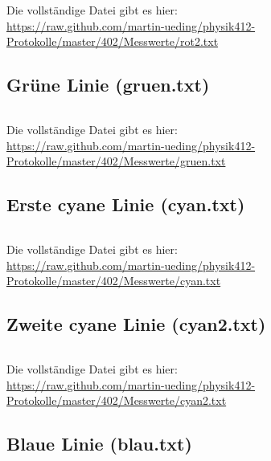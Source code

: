 \begin{appendix}
    Die vollständige Datei gibt es hier: \\
    \url{https://raw.github.com/martin-ueding/physik412-Protokolle/master/402/Messwerte/rot2.txt}

    \subsection{Grüne Linie (gruen.txt)}
    \begin{multicols}{5}
        \inputminted[tabsize=4, firstline=<< gruen_lower >>, lastline=<< gruen_upper >>, fontsize=\footnotesize]{text}{../Messwerte/gruen.txt}
    \end{multicols}

    Die vollständige Datei gibt es hier: \\
    \url{https://raw.github.com/martin-ueding/physik412-Protokolle/master/402/Messwerte/gruen.txt}

    \subsection{Erste cyane Linie (cyan.txt)}
    \begin{multicols}{5}
        \inputminted[tabsize=4, firstline=<< cyan_lower >>, lastline=<< cyan_upper >>, fontsize=\footnotesize]{text}{../Messwerte/cyan.txt}
    \end{multicols}

    Die vollständige Datei gibt es hier: \\
    \url{https://raw.github.com/martin-ueding/physik412-Protokolle/master/402/Messwerte/cyan.txt}

    \subsection{Zweite cyane Linie (cyan2.txt)}
    \begin{multicols}{5}
        \inputminted[tabsize=4, firstline=<< cyan2_lower >>, lastline=<< cyan2_upper >>, fontsize=\footnotesize]{text}{../Messwerte/cyan2.txt}
    \end{multicols}

    Die vollständige Datei gibt es hier: \\
    \url{https://raw.github.com/martin-ueding/physik412-Protokolle/master/402/Messwerte/cyan2.txt}

    \subsection{Blaue Linie (blau.txt)}
    \begin{multicols}{5}
        \inputminted[tabsize=4, firstline=<< blau_lower >>, lastline=<< blau_upper >>, fontsize=\footnotesize]{text}{../Messwerte/blau.txt}
    \end{multicols}


\end{appendix}
